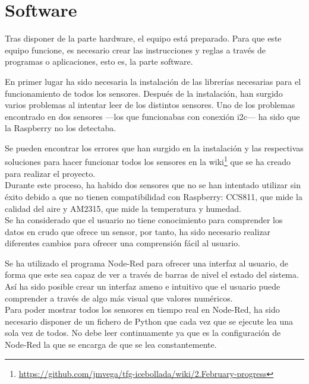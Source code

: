 \section{Software}
Tras disponer de la parte hardware, el equipo está preparado. Para que este equipo funcione, es necesario crear las instrucciones y reglas a través de programas o aplicaciones, esto es, la parte software.

En primer lugar ha sido necesaria la instalación de las librerías necesarias para el funcionamiento de todos los sensores. Después de la instalación, han surgido varios problemas al intentar leer de los distintos sensores. Uno de los problemas encontrado en dos sensores ---los que funcionabas con conexión i2c--- ha sido que la Raspberry no los detectaba.

Se pueden encontrar los errores que han surgido en la instalación y las respectivas soluciones para hacer funcionar todos los sensores en la wiki\footnote{\url{https://github.com/jmvega/tfg-icebollada/wiki/2.February-progress}} que se ha creado para realizar el proyecto.\\

Durante este proceso, ha habido dos sensores que no se han intentado utilizar sin éxito debido a que no tienen compatibilidad con Raspberry: CCS811, que mide la calidad del aire y AM2315, que mide la temperatura y humedad.\\

Se ha considerado que el usuario no tiene conocimiento para comprender los datos en crudo que ofrece un sensor, por tanto, ha sido necesario realizar diferentes cambios para ofrecer una comprensión fácil al usuario.

Se ha utilizado el programa Node-Red para ofrecer una interfaz al usuario, de forma que este sea capaz de ver a través de barras de nivel el estado del sistema. Así ha sido posible crear un interfaz ameno e intuitivo que el usuario puede comprender a través de algo más visual que valores numéricos.\\

Para poder mostrar todos los sensores en tiempo real en Node-Red, ha sido necesario disponer de un fichero de Python que  cada vez que se ejecute lea una sola vez de todos. No debe leer continuamente ya que es la configuración de Node-Red la que se encarga de que se lea constantemente. 

